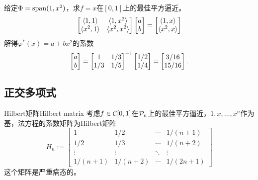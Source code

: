 \begin{example}
    {}{}
    给定$\Phi = \operatorname{span}(1,x^2)$，求$f = x$在$[0,1]$上的最佳平方逼近。
    \[
        \begin{bmatrix}
            \langle1,1\rangle&\langle1,x^2\rangle\\
            \langle x^2,1\rangle&\langle x^2,x^2\rangle
        \end{bmatrix}\begin{bmatrix}
            a\\b
        \end{bmatrix} = \begin{bmatrix}
            \langle1,x\rangle\\\langle x^2,x\rangle
        \end{bmatrix}
    \]
    解得$\varphi^*(x) = a + bx^2$的系数
    \[
        \begin{bmatrix}
            a\\b
        \end{bmatrix} = \begin{bmatrix}
            1&1/3\\1/3&1/5
        \end{bmatrix}^{-1}\begin{bmatrix}
            1/2\\1/4
        \end{bmatrix} = \begin{bmatrix}
            3/16\\15/16
        \end{bmatrix}.
    \]
\end{example}

\subsection{正交多项式}

\begin{definition}
    {Hilbert矩阵}{Hilbert matrix}
    考虑$f \in \mathcal{C}[0,1]$在$\mathcal{P}_n$上的最佳平方逼近，$1,x,\ldots,x^n$作为基，法方程的系数矩阵为Hilbert矩阵
    \begin{equation}
        H_n := \begin{bmatrix}
            1&1/2&\cdots&1/(n + 1)\\
            1/2&1/3&\cdots&1/(n + 2)\\
            \vdots&\vdots&\ddots&\vdots\\
            1/(n + 1)&1/(n + 2)&\cdots&1/(2n + 1)
        \end{bmatrix}
    \end{equation}
    这个矩阵是严重病态的。
\end{definition}

